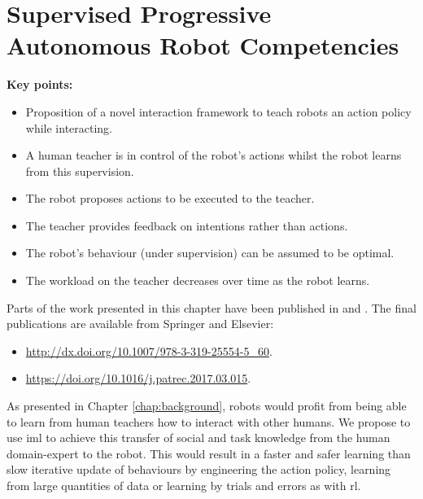 \chapter{Supervised Progressive Autonomous Robot \newline Competencies}\label{chap:sparc}
\glsresetall
\graphicspath{{images/sparc/}}

\begin{framed}
	\textbf{Key points:}
	\begin{itemize}
		\item Proposition of a novel interaction framework to teach robots an action policy while interacting.
		\item A human teacher is in control of the robot's actions whilst the robot learns from this supervision.
		\item The robot proposes actions to be executed to the teacher.
		\item The teacher provides feedback on intentions rather than actions.
		\item The robot's behaviour (under supervision) can be assumed to be optimal.
		\item The workload on the teacher decreases over time as the robot learns.
	\end{itemize}
\end{framed}

Parts of the work presented in this chapter have been published in \cite{senft2015sparc} and \cite{senft2017supervised}. The final publications are available from Springer and Elsevier:
\begin{itemize}
	\item \url{http://dx.doi.org/10.1007/978-3-319-25554-5_60}.
	\item \url{https://doi.org/10.1016/j.patrec.2017.03.015}.
\end{itemize}

\newpage

As presented in Chapter \ref{chap:background}, robots would profit from being able to learn from human teachers how to interact with other humans. We propose to use \gls{iml} to achieve this transfer of social and task knowledge from the human domain-expert to the robot. This would result in a faster and safer learning than slow iterative update of behaviours by engineering the action policy, learning from large quantities of data or learning by trials and errors as with \gls{rl}.


